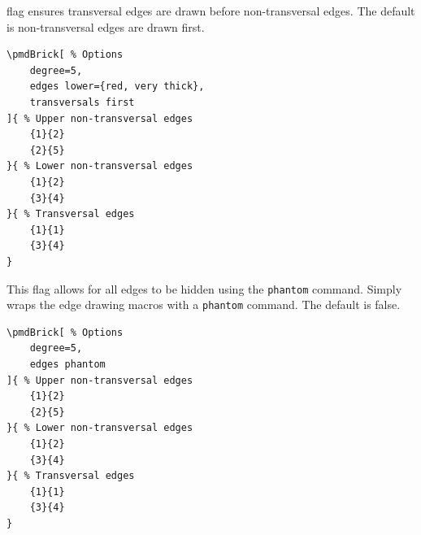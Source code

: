 \documentclass{ltxdoc}
\begin{document}
flag ensures transversal edges are drawn before non-transversal edges. The default is non-transversal edges are drawn first.
\begin{center}
    \begin{minipage}{\dimexpr0.85\textwidth-2\fboxrule-2\fboxsep\relax}
        \begin{minipage}[c]{0.4\linewidth}
\begin{verbatim}
\pmdBrick[ % Options
    degree=5,
    edges lower={red, very thick},
    transversals first
]{ % Upper non-transversal edges
    {1}{2}
    {2}{5}
}{ % Lower non-transversal edges
    {1}{2}
    {3}{4}
}{ % Transversal edges
    {1}{1}
    {3}{4}
}
\end{verbatim}
        \end{minipage}
        \hfill
        \begin{minipage}[c]{0.4\linewidth}
        \end{minipage}
    \end{minipage}%
\end{center}

This flag allows for all edges to be hidden using the \texttt{phantom} command. Simply wraps the edge drawing macros with a \texttt{phantom} command. The default is false.
\begin{center}
    \begin{minipage}{\dimexpr0.85\textwidth-2\fboxrule-2\fboxsep\relax}
        \begin{minipage}[c]{0.4\linewidth}
\begin{verbatim}
\pmdBrick[ % Options
    degree=5,
    edges phantom
]{ % Upper non-transversal edges
    {1}{2}
    {2}{5}
}{ % Lower non-transversal edges
    {1}{2}
    {3}{4}
}{ % Transversal edges
    {1}{1}
    {3}{4}
}
\end{verbatim}
        \end{minipage}
        \hfill
        \begin{minipage}[c]{0.4\linewidth}
        \end{minipage}
    \end{minipage}%
\end{center}
\end{document}
